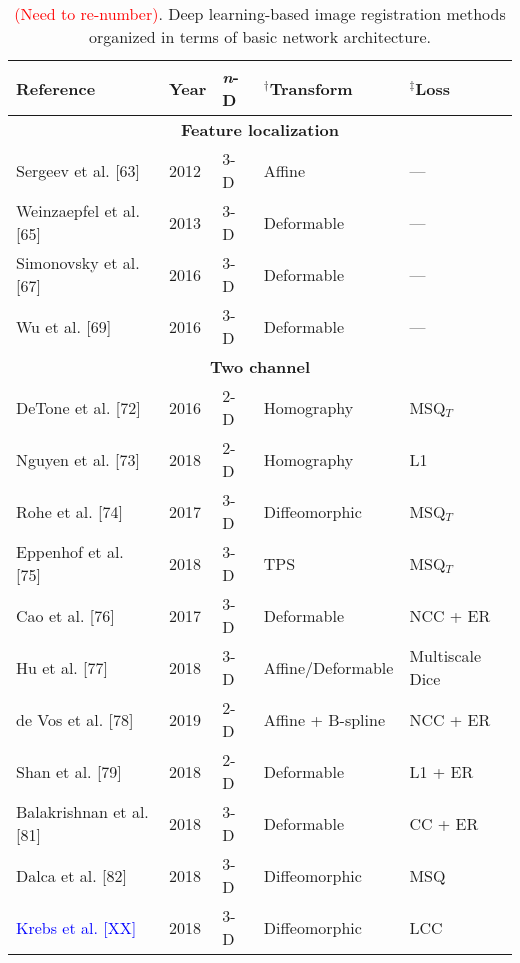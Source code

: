 \begin{table}[!htb]
\centering
\caption{\textcolor{red}{(Need to re-number)}.  Deep learning-based image registration methods organized in terms of basic
         network architecture.}
\label{table:methods}
\begin{tabular*}{\textwidth}{l@{\extracolsep{\fill}}l@{\extracolsep{\fill}}l@{\extracolsep{\fill}}ll}
\toprule
\midrule
\textbf{Reference} & \textbf{Year} & \textbf{\textit{n}-D} & $^\dagger$\textbf{Transform} & $^\ddagger$\textbf{Loss} \\
\midrule
\midrule
\multicolumn{5}{c}{\textbf{Feature localization}}
  \vspace{0.25cm} \\
  Sergeev et al. [63] & 2012 & 3-D & Affine & --- \\
  Weinzaepfel et al. [65] & 2013 & 3-D & Deformable & --- \\
  Simonovsky et al. [67] & 2016 & 3-D & Deformable & --- \\
  Wu et al. [69] & 2016 & 3-D & Deformable & --- \\
\midrule
\multicolumn{5}{c}{\textbf{Two channel}}
  \vspace{0.25cm} \\
  DeTone et al. [72] & 2016 & 2-D & Homography & MSQ$_T$ \\ %
  Nguyen et al. [73] & 2018 & 2-D & Homography & L1 \\
  Rohe et al. [74] & 2017 & 3-D & Diffeomorphic & MSQ$_T$ \\  %
  Eppenhof et al. [75] & 2018 & 3-D & TPS & MSQ$_T$ \\       %
  Cao et al. [76] & 2017 & 3-D & Deformable & NCC + ER \\
  Hu et al. [77] & 2018 & 3-D & Affine/Deformable & Multiscale Dice \\
  de Vos et al. [78] & 2019 & 2-D & Affine + B-spline & NCC + ER \\
  Shan et al. [79] & 2018 & 2-D & Deformable & L1 + ER \\
  Balakrishnan et al. [81] & 2018 & 3-D & Deformable & CC + ER \\
  Dalca et al. [82] & 2018 & 3-D & Diffeomorphic & MSQ \\
  \textcolor{blue}{Krebs et al. [XX]} & 2018 & 3-D & Diffeomorphic & LCC \\

\end{tabular*}
\end{table}
